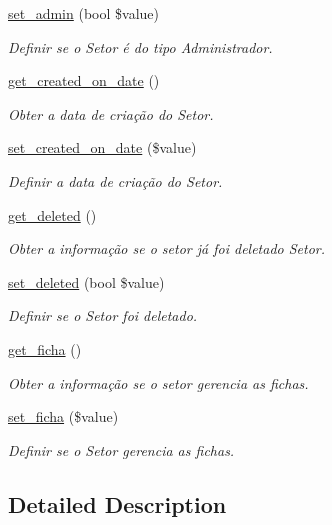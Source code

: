 \begin{DoxyCompactItemize}
\hyperlink{class_class_setor_ab31da576d6d4983080ed6ed0cc9d2ed2}{set\+\_\+admin} (bool \$value)
\begin{DoxyCompactList}\small\item\em Definir se o Setor é do tipo Administrador. \end{DoxyCompactList}\item 
\hyperlink{class_class_setor_a9a1ef394f9aef6ab037f8bb37209242f}{get\+\_\+created\+\_\+on\+\_\+date} ()
\begin{DoxyCompactList}\small\item\em Obter a data de criação do Setor. \end{DoxyCompactList}\item 
\hyperlink{class_class_setor_a792b5876e9d76a4f030e436aeec2a855}{set\+\_\+created\+\_\+on\+\_\+date} (\$value)
\begin{DoxyCompactList}\small\item\em Definir a data de criação do Setor. \end{DoxyCompactList}\item 
\hyperlink{class_class_setor_ad6172a0f313f12f05c08efc37a9c3656}{get\+\_\+deleted} ()
\begin{DoxyCompactList}\small\item\em Obter a informação se o setor já foi deletado Setor. \end{DoxyCompactList}\item 
\hyperlink{class_class_setor_acd0a4e339896072e5515b8fdcc33344d}{set\+\_\+deleted} (bool \$value)
\begin{DoxyCompactList}\small\item\em Definir se o Setor foi deletado. \end{DoxyCompactList}\item 
\hyperlink{class_class_setor_ac2cfa14d360149ee30216aec7e50cb20}{get\+\_\+ficha} ()
\begin{DoxyCompactList}\small\item\em Obter a informação se o setor gerencia as fichas. \end{DoxyCompactList}\item 
\hyperlink{class_class_setor_a592f14a6c34825448b303800bf41b1bb}{set\+\_\+ficha} (\$value)
\begin{DoxyCompactList}\small\item\em Definir se o Setor gerencia as fichas. \end{DoxyCompactList}\end{DoxyCompactItemize}


\subsection{Detailed Description}


